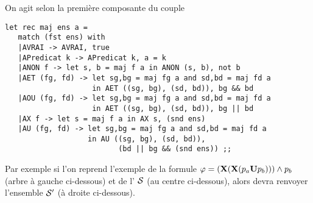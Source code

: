 \begin{Answer}
On agit selon la première composante du couple
\begin{lstlisting}
let rec maj ens a = 
   match (fst ens) with
   |AVRAI -> AVRAI, true
   |APredicat k -> APredicat k, a = k
   |ANON f -> let s, b = maj f a in ANON (s, b), not b
   |AET (fg, fd) -> let sg,bg = maj fg a and sd,bd = maj fd a
                    in AET ((sg, bg), (sd, bd)), bg && bd
   |AOU (fg, fd) -> let sg,bg = maj fg a and sd,bd = maj fd a
                    in AET ((sg, bg), (sd, bd)), bg || bd
   |AX f -> let s = maj f a in AX s, (snd ens)
   |AU (fg, fd) -> let sg,bg = maj fg a and sd,bd = maj fd a
                   in AU ((sg, bg), (sd, bd)),
                          (bd || bg && (snd ens)) ;;
\end{lstlisting}
\end{Answer}

Par exemple si l'on reprend l'exemple de la formule $\varphi=({\bf X}({\bf X}(p_a {\bf U} p_b))) \wedge p_b$ (arbre à gauche ci-dessous) et de l' $\cal S$ (au centre ci-dessous), alors  devra renvoyer l'ensemble $\cal S'$ (à droite ci-dessous).
\medskip

